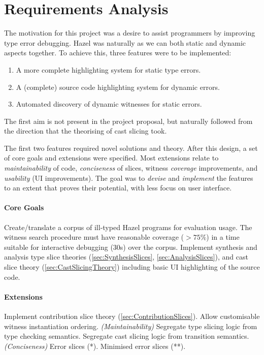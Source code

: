 \section{Requirements Analysis}\label{sec:RequirementAnalysis}
The motivation for this project was a desire to assist programmers by improving type error debugging. Hazel was naturally as we can both static and dynamic aspects together. To achieve this, three features were to be implemented:
\begin{enumerate}
\item A more complete highlighting system for static type errors.
\item A (complete) source code highlighting system for dynamic errors.
\item Automated discovery of dynamic witnesses for static errors.
\end{enumerate}
The first aim is not present in the project proposal, but naturally followed from the direction that the theorising of cast slicing took.

The first two features required novel solutions and theory. After this design, a set of core goals and extensions were specified. Most extensions relate to \textit{maintainability} of code, \textit{conciseness} of slices, witness \textit{coverage} improvements, and \textit{usability} (UI improvements). The goal was to \textit{devise} and \textit{implement} the features to an extent that proves their potential, with less focus on user interface.

\paragraph{{\color{red} Core Goals}} Create/translate a corpus of ill-typed Hazel programs for evaluation usage. The witness search procedure must have reasonable coverage ($>75\%$) in a time suitable for interactive debugging (30s) over the corpus. Implement synthesis and analysis type slice theories (\cref{sec:SynthesisSlices}, \ref{sec:AnalysisSlices}), and cast slice theory (\cref{sec:CastSlicingTheory}) including basic UI highlighting of the source code.

\paragraph{{\color{orange} Extensions}} Implement contribution slice theory (\cref{sec:ContributionSlices}). Allow customisable witness instantiation ordering. \textit{(Maintainability)} Segregate type slicing logic from type checking semantics. Segregate cast slicing logic from transition semantics. \textit{(Conciseness)} Error slices (*). Minimised error slices (**). 

